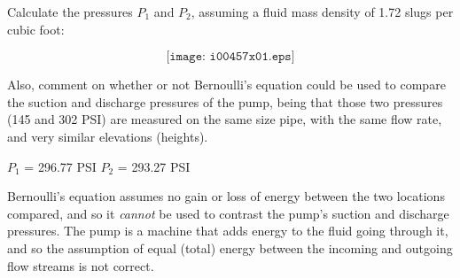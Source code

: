 

Calculate the pressures $P_1$ and $P_2$, assuming a fluid mass density of 1.72 slugs per cubic foot:

$$\texttt{[image: i00457x01.eps]}$$

Also, comment on whether or not Bernoulli's equation could be used to compare the suction and discharge pressures of the pump, being that those two pressures (145 and 302 PSI) are measured on the same size pipe, with the same flow rate, and very similar elevations (heights).







$P_1$ = 296.77 PSI \hskip 30pt $P_2$ = 293.27 PSI

\vskip 10pt

Bernoulli's equation assumes no gain or loss of energy between the two locations compared, and so it {\it cannot} be used to contrast the pump's suction and discharge pressures.  The pump is a machine that adds energy to the fluid going through it, and so the assumption of equal (total) energy between the incoming and outgoing flow streams is not correct.










